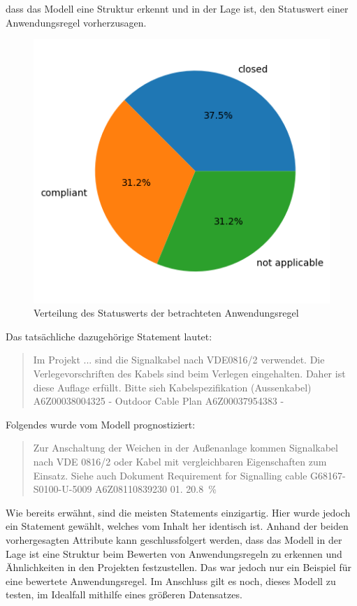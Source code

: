 dass das Modell eine Struktur erkennt und in der Lage ist, den Statuswert einer Anwendungsregel vorherzusagen.
\begin{figure}[H]
    \centering
    \includegraphics[width=.5\textwidth]{abbildungen/StatusTest.png}
    \caption{Verteilung des Statuswerts der betrachteten Anwendungsregel}
    \label{fig:StatusTest}
\end{figure}
\pagebreak
Das tatsächliche dazugehörige Statement lautet: 
\begin{quotation}
    \noindent Im Projekt ... sind die Signalkabel nach VDE0816/2 verwendet. Die Verlegevorschriften des Kabels sind beim Verlegen eingehalten. Daher ist diese Auflage erfüllt.  
    Bitte sieh  Kabelspezifikation (Aussenkabel)  A6Z00038004325  -  Outdoor Cable Plan  A6Z00037954383  -
\end{quotation}
Folgendes wurde vom Modell prognostiziert:
\begin{quotation}
    \noindent Zur Anschaltung der Weichen in der Außenanlage kommen Signalkabel nach  VDE 0816/2 oder Kabel mit vergleichbaren Eigenschaften zum Einsatz. Siehe  auch Dokument Requirement for 
    Signalling cable G68167-S0100-U-5009   A6Z08110839230  01.  20.8~\%
\end{quotation}
Wie bereits erwähnt, sind die meisten Statements einzigartig. Hier wurde jedoch ein Statement gewählt, welches vom Inhalt her identisch ist. Anhand der beiden vorhergesagten Attribute
kann geschlussfolgert werden, dass das Modell in der Lage ist eine Struktur beim Bewerten von Anwendungsregeln zu erkennen und Ähnlichkeiten in den Projekten festzustellen. Das war jedoch
nur ein Beispiel für eine bewertete Anwendungsregel. Im Anschluss gilt es noch, dieses Modell zu testen, im Idealfall mithilfe eines größeren Datensatzes.